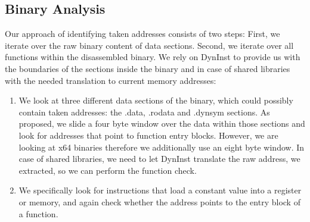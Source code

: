 \subsection{Binary Analysis}
Our approach of identifying taken addresses consists of two steps: First, we iterate over the raw binary content of data sections. Second, we iterate over all functions within the disassembled binary. We rely on DynInst to provide us with the boundaries of the sections inside the binary and in case of shared libraries with the needed translation to current memory addresses:

\begin{enumerate}
\item We look at three different data sections of the binary, which could possibly contain taken addresses: the .data, .rodata and .dynsym sections. As \cite{mingwei:sekar} proposed, we slide a four byte window over the data within those sections and look for addresses that point to function entry blocks. However, we are looking at x64 binaries therefore we additionally use an eight byte window. In case of shared libraries, we need to let DynInst translate the raw address, we extracted, so we can perform the function check.

\item We specifically look for instructions that load a constant value into a register or memory, and again check whether the address points to the entry block of a function.
\end{enumerate}
%
%


